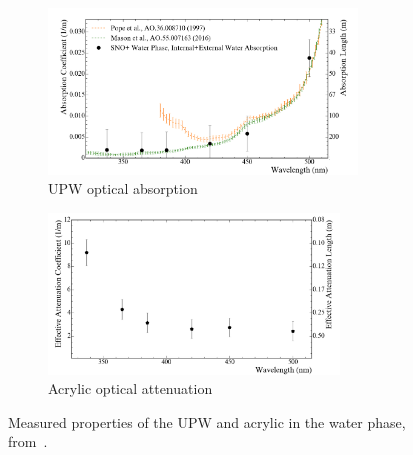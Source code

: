 \begin{figure}
    \centering
    \begin{subfigure}{0.98\textwidth}
        \centering
        \includegraphics[width=0.9\textwidth]{2_Detector/Figs/WaterAbsorption.png}
        \caption{UPW optical absorption}
        \label{fig:abs_length_water_optics_paper}
    \end{subfigure}
    \begin{subfigure}{0.98\textwidth}
        \centering
        \includegraphics[width=0.85\textwidth]{2_Detector/Figs/AcrylicAttenuation.png}
        \caption{Acrylic optical attenuation}
        \label{fig:abs_length_acylic_optics_paper}
    \end{subfigure}
    \caption[Measured properties of the UPW and acrylic in the water phase.]{Measured properties of the UPW and acrylic in the water phase, from~\cite{andersonOpticalCalibrationSNO2021}.}
    \label{fig:abs_lengths_optics_paper}
\end{figure}

